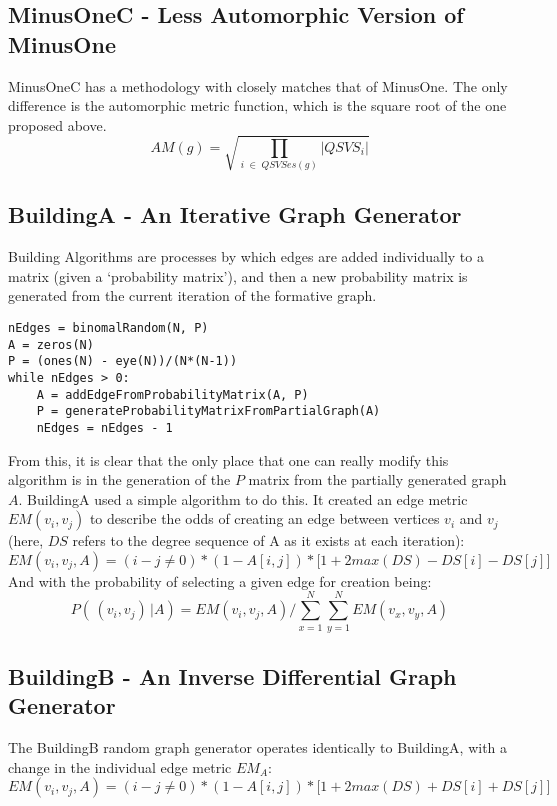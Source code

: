 \subsection{MinusOneC - Less Automorphic Version of MinusOne}

MinusOneC has a methodology with closely matches that of MinusOne.
The only difference is the automorphic metric function, which is the square root of the one proposed above.
$$AM(g) = \sqrt{\prod_{i \;\in \;QSVSes(g)} |QSVS_i|}$$

\subsection{BuildingA - An Iterative Graph Generator}

Building Algorithms are processes by which edges are added individually to a matrix (given a `probability matrix'), and then a new probability matrix is generated from the current iteration of the formative graph.

\begin{lstlisting}[frame=single]
nEdges = binomalRandom(N, P)
A = zeros(N)
P = (ones(N) - eye(N))/(N*(N-1))
while nEdges > 0:
	A = addEdgeFromProbabilityMatrix(A, P)
	P = generateProbabilityMatrixFromPartialGraph(A)
	nEdges = nEdges - 1
\end{lstlisting}

From this, it is clear that the only place that one can really modify this algorithm is in the generation of the $P$ matrix from the partially generated graph $A$.
BuildingA used a simple algorithm to do this.
It created an edge metric $EM(v_i, v_j)$ to describe the odds of creating an edge between vertices $v_i$ and $v_j$ (here, $DS$ refers to the degree sequence of A as it exists at each iteration):
$$ EM(v_i, v_j, A) = (i - j  \neq 0) * (1 - A[i, j]) * \Big[ 1 + 2 max(DS) - DS[i] - DS[j] \Big] $$
And with the probability of selecting a given edge for creation being:
$$P(\,(v_i, v_j) \,| A) = EM(v_i, v_j, A) / \sum_{x = 1}^{N} \sum_{y = 1}^{N} EM(v_x, v_y, A)$$

\subsection{BuildingB - An Inverse Differential Graph Generator}

The BuildingB random graph generator operates identically to BuildingA, with a change in the individual edge metric $EM_A$:
$$ EM(v_i, v_j, A) = (i - j  \neq 0) * (1 - A[i, j]) * \Big[ 1 + 2 max(DS) + DS[i] + DS[j] \Big] $$

